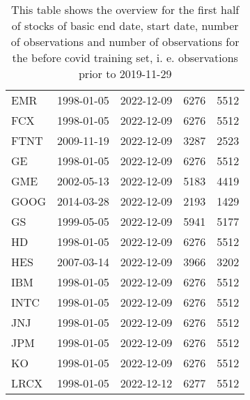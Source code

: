 \begin{table}[ht]
\begin{tabular}{lllrr}
  EMR & 1998-01-05 & 2022-12-09 & 6276 & 5512 \\ 
  FCX & 1998-01-05 & 2022-12-09 & 6276 & 5512 \\ 
  FTNT & 2009-11-19 & 2022-12-09 & 3287 & 2523 \\ 
  GE & 1998-01-05 & 2022-12-09 & 6276 & 5512 \\ 
  GME & 2002-05-13 & 2022-12-09 & 5183 & 4419 \\ 
  GOOG & 2014-03-28 & 2022-12-09 & 2193 & 1429 \\ 
  GS & 1999-05-05 & 2022-12-09 & 5941 & 5177 \\ 
  HD & 1998-01-05 & 2022-12-09 & 6276 & 5512 \\ 
  HES & 2007-03-14 & 2022-12-09 & 3966 & 3202 \\ 
  IBM & 1998-01-05 & 2022-12-09 & 6276 & 5512 \\ 
  INTC & 1998-01-05 & 2022-12-09 & 6276 & 5512 \\ 
  JNJ & 1998-01-05 & 2022-12-09 & 6276 & 5512 \\ 
  JPM & 1998-01-05 & 2022-12-09 & 6276 & 5512 \\ 
  KO & 1998-01-05 & 2022-12-09 & 6276 & 5512 \\ 
  LRCX & 1998-01-05 & 2022-12-12 & 6277 & 5512 \\ 
   \hline
\end{tabular}
\caption[Overview_1]{This table shows the overview for the first half of stocks of basic end date, start date, number of observations and number of observations 
                     for the before covid training set, i. e. observations prior to 2019-11-29} 
\label{Table:Overview_1}
\end{table}
